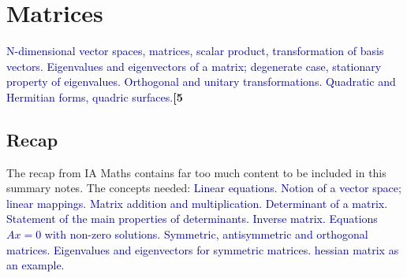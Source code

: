 \documentclass[a4paper]{article}
\begin{document}
\section{Matrices}
{\small\textcolor{darkblue}{N-dimensional vector spaces, matrices, scalar product, transformation of basis vectors. Eigenvalues and eigenvectors of a matrix; degenerate case, stationary property of eigenvalues. Orthogonal and unitary transformations. Quadratic and Hermitian forms, quadric surfaces.}\hfill\textbf{[5}}
\subsection{Recap}
The recap from IA Maths contains far too much content to be included in this summary notes. The concepts needed: 
{\small\textcolor{darkblue}{Linear equations. Notion of a vector space; linear mappings. Matrix addition and multiplication. Determinant of a matrix. Statement of the main properties of determinants. Inverse matrix. Equations $Ax=0$ with non-zero solutions. Symmetric, antisymmetric and orthogonal matrices. Eigenvalues and eigenvectors for symmetric matrices. hessian matrix as an example.}}
\end{document}
